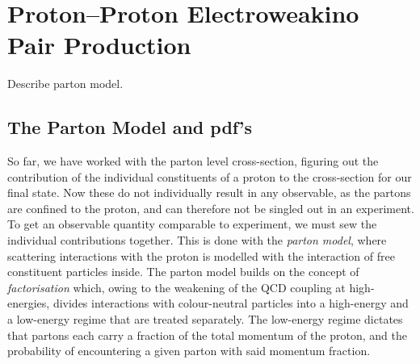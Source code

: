 \documentclass[../main.tex]{subfiles}
\begin{document}
\chapter{Proton--Proton Electroweakino Pair Production}

\begin{TODO}
  \item Describe parton model.
\end{TODO}

\section{The Parton Model and pdf's}
So far, we have worked with the parton level cross-section, figuring out the contribution of the individual constituents of a proton to the cross-section for our final state.
Now these do not individually result in any observable, as the partons are confined to the proton, and can therefore not be singled out in an experiment.
To get an observable quantity comparable to experiment, we must sew the individual contributions together.
This is done with the \emph{parton model}, where scattering interactions with the proton is modelled with the interaction of free constituent particles inside.
The parton model builds on the concept of \emph{factorisation} which, owing to the weakening of the QCD coupling at high-energies, divides interactions with colour-neutral particles into a high-energy and a low-energy regime that are treated separately.
The low-energy regime dictates that partons each carry a fraction of the total momentum of the proton, and the probability of encountering a given parton with said momentum fraction.
\end{document}
